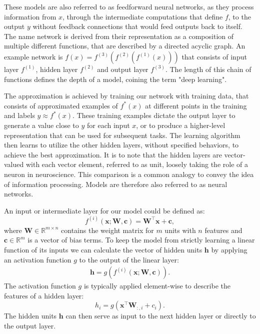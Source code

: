 These models are also referred to as feedforward neural networks, as they process information from $x$, through the intermediate computations that define $f$, to the output $y$ without feedback connections that would feed outputs back to itself. The name network is derived from their representation as a composition of multiple different functions, that are described by a directed acyclic graph. An example network is $f(x) = f^{(3)}(f^{(2)}(f^{(1)}(x)))$ that consists of input layer $f^{(1)}$, hidden layer $f^{(2)}$ and output layer $f^{(3)}$. The length of this chain of functions defines the depth of a model, coining the term "deep learning". 

The approximation is achieved by training our network with training data, that consists of approximated examples of $f^*(x)$ at different points in the training and labels $y\approx f^*(x)$. These training examples dictate the output layer to generate a value close to $y$ for each input $x$, or to produce a higher-level representation that can be used for subsequent tasks. The learning algorithm then learns to utilize the other hidden layers, without specified behaviors, to achieve the best approximation. It is to note that the hidden layers are vector-valued with each vector element, referred to as unit, loosely taking the role of a neuron in neuroscience. This comparison is a common analogy to convey the idea of information processing. Models are therefore also referred to as neural networks.


An input or intermediate layer for our model could be defined as:
\begin{equation}
    f^{(i)}(\mathbf{x}; \mathbf{W},\mathbf{c})=\mathbf{W}^\top\mathbf{x}+\mathbf{c},
\end{equation}
where $\mathbf{W} \in \mathbb{R}^{m\times n}$ contains the weight matrix for $m$ units with $n$ features and $\mathbf{c}\in \mathbb{R}^m$ is a vector of bias terms.
To keep the model from strictly learning a linear function of its inputs we can calculate the vector of hidden units $\mathbf{h}$ by applying an activation function $g$ to the output of the linear layer:
\begin{align}
    \mathbf{h} = g(f^{(i)}(\mathbf{x}; \mathbf{W},\mathbf{c})).
\end{align}
The activation function $g$ is typically applied element-wise to describe the features of a hidden layer:
\begin{equation}
    h_i = g(\mathbf{x}^\top\mathbf{W}_{:,i}+c_i).
\end{equation}
The hidden units $\mathbf{h}$ can then serve as input to the next hidden layer or directly to the output layer.

